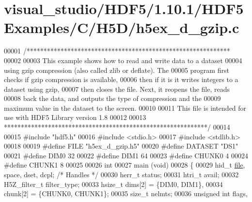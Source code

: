 \hypertarget{visual__studio_2_h_d_f5_21_810_81_2_h_d_f5_examples_2_c_2_h5_d_2h5ex__d__gzip_8c_source}{}\section{visual\+\_\+studio/\+H\+D\+F5/1.10.1/\+H\+D\+F5\+Examples/\+C/\+H5\+D/h5ex\+\_\+d\+\_\+gzip.c}
\label{visual__studio_2_h_d_f5_21_810_81_2_h_d_f5_examples_2_c_2_h5_d_2h5ex__d__gzip_8c_source}

\begin{DoxyCode}
00001 \textcolor{comment}{/************************************************************}
00002 \textcolor{comment}{}
00003 \textcolor{comment}{  This example shows how to read and write data to a dataset}
00004 \textcolor{comment}{  using gzip compression (also called zlib or deflate).  The}
00005 \textcolor{comment}{  program first checks if gzip compression is available,}
00006 \textcolor{comment}{  then if it is it writes integers to a dataset using gzip,}
00007 \textcolor{comment}{  then closes the file.  Next, it reopens the file, reads}
00008 \textcolor{comment}{  back the data, and outputs the type of compression and the}
00009 \textcolor{comment}{  maximum value in the dataset to the screen.}
00010 \textcolor{comment}{}
00011 \textcolor{comment}{  This file is intended for use with HDF5 Library version 1.8}
00012 \textcolor{comment}{}
00013 \textcolor{comment}{ ************************************************************/}
00014 
00015 \textcolor{preprocessor}{#include "hdf5.h"}
00016 \textcolor{preprocessor}{#include <stdio.h>}
00017 \textcolor{preprocessor}{#include <stdlib.h>}
00018 
00019 \textcolor{preprocessor}{#define FILE            "h5ex\_d\_gzip.h5"}
00020 \textcolor{preprocessor}{#define DATASET         "DS1"}
00021 \textcolor{preprocessor}{#define DIM0            32}
00022 \textcolor{preprocessor}{#define DIM1            64}
00023 \textcolor{preprocessor}{#define CHUNK0          4}
00024 \textcolor{preprocessor}{#define CHUNK1          8}
00025 
00026 \textcolor{keywordtype}{int}
00027 main (\textcolor{keywordtype}{void})
00028 \{
00029     hid\_t           \hyperlink{structfile}{file}, space, dset, dcpl;    \textcolor{comment}{/* Handles */}
00030     herr\_t          status;
00031     htri\_t          avail;
00032     H5Z\_filter\_t    filter\_type;
00033     hsize\_t         dims[2] = \{DIM0, DIM1\},
00034                     chunk[2] = \{CHUNK0, CHUNK1\};
00035     \textcolor{keywordtype}{size\_t}          nelmts;
00036     \textcolor{keywordtype}{unsigned} \textcolor{keywordtype}{int}    flags,

\end{DoxyCode}
